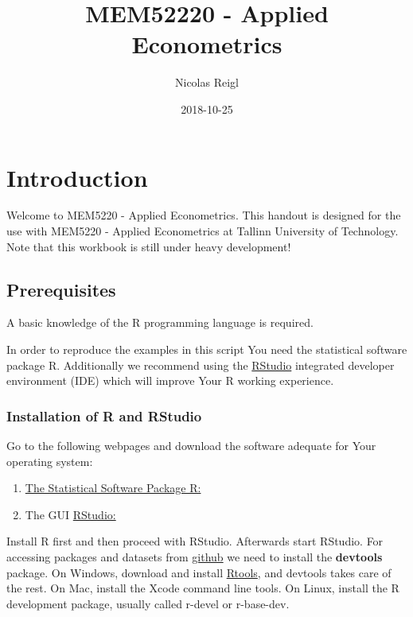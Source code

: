 \documentclass[]{book}
\title{MEM52220 - Applied Econometrics}
\author{Nicolas Reigl}
\date{2018-10-25}
\providecommand{\tightlist}{%
  \setlength{\itemsep}{0pt}\setlength{\parskip}{0pt}}
\begin{document}
\maketitle

{
\setcounter{tocdepth}{1}
\tableofcontents
}
\hypertarget{introduction}{%
\chapter*{Introduction}\label{introduction}}

Welcome to MEM5220 - Applied Econometrics. This handout is designed for
the use with MEM5220 - Applied Econometrics at Tallinn University of
Technology. Note that this workbook is still under heavy development!

\hypertarget{prerequisites}{%
\section*{Prerequisites}\label{prerequisites}}

A basic knowledge of the R \citep{team2013r} programming language is
required.

In order to reproduce the examples in this script You need the
statistical software package R. Additionally we recommend using the
\href{https://www.rstudio.com}{RStudio} integrated developer environment
(IDE) which will improve Your R working experience.

\hypertarget{installation-of-r-and-rstudio}{%
\subsection*{Installation of R and
RStudio}\label{installation-of-r-and-rstudio}}

Go to the following webpages and download the software adequate for Your
operating system:

\begin{enumerate}
\def\labelenumi{\arabic{enumi}.}
\tightlist
\item
  \href{http://cran.r-project.org}{The Statistical Software Package R:}
\item
  The GUI \href{https://www.rstudio.com}{RStudio:}
\end{enumerate}

Install R first and then proceed with RStudio. Afterwards start RStudio.
For accessing packages and datasets from
\href{https://github.com/}{github} we need to install the
\textbf{devtools} package. On Windows, download and install
\href{https://cran.r-project.org/bin/windows/Rtools/}{Rtools}, and
devtools takes care of the rest. On Mac, install the Xcode command line
tools. On Linux, install the R development package, usually called
r-devel or r-base-dev.
\end{document}
